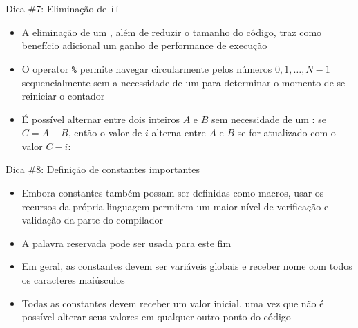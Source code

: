 \begin{frame}[fragile]{Dica \#7: Eliminação de \texttt{if}}

    \begin{itemize}
        \item A eliminação de um , além de reduzir o tamanho do código,
            traz como benefício adicional um ganho de performance de execução

        \item O operator \texttt{\%} permite navegar circularmente pelos números
            $0, 1, \ldots, N - 1$ sequencialmente sem a 
            necessidade de um  para determinar o momento de se reiniciar o 
            contador

        \item É possível alternar entre dois inteiros $A$ e $B$ sem necessidade de um 
            : se $C = A + B$, então o valor de $i$ alterna entre $A$ e $B$ 
            se for atualizado com o valor $C - i$:
    \end{itemize}

\end{frame}

\begin{frame}[fragile]{Dica \#8: Definição de constantes importantes}

    \begin{itemize}
        \item Embora constantes também possam ser definidas como macros, usar os recursos
            da própria linguagem permitem um maior nível de verificação e validação da
            parte do compilador

        \item A palavra reservada  pode ser usada para este fim

        \item Em geral, as constantes devem ser variáveis globais e receber nome com todos os
            caracteres maiúsculos

        \item Todas as constantes devem receber um valor inicial, uma vez que não é possível
            alterar seus valores em qualquer outro ponto do código


    \end{itemize}

\end{frame}
